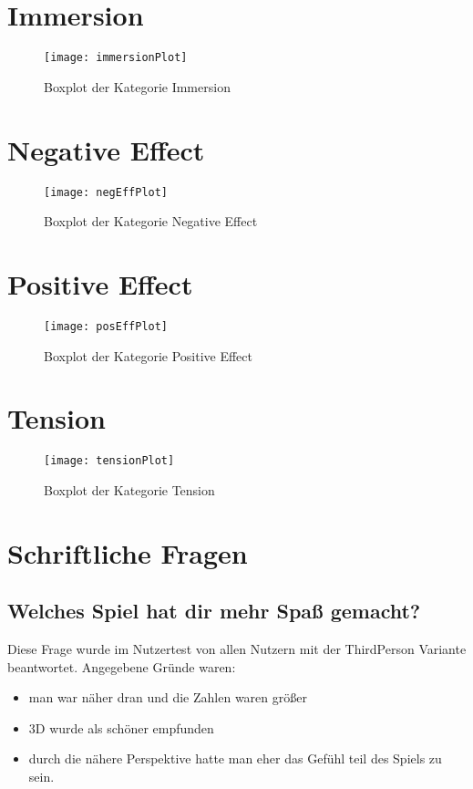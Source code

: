\section{Immersion}
\begin{figure}[h!tb]
	\centering
	\texttt{[image: immersionPlot]}
	\caption{Boxplot der Kategorie Immersion\label{fig:immersionbox}}
\end{figure}

\section{Negative Effect}
\begin{figure}[h!tb]
	\centering
	\texttt{[image: negEffPlot]}
	\caption{Boxplot der Kategorie Negative Effect\label{fig:negeffbox}}
\end{figure}

\section{Positive Effect}
\begin{figure}[htb]
	\centering
	\texttt{[image: posEffPlot]}
	\caption{Boxplot der Kategorie Positive Effect\label{fig:poseffbox}}
\end{figure}

\section{Tension}
\begin{figure}[htb]
	\centering
	\texttt{[image: tensionPlot]}
	\caption{Boxplot der Kategorie Tension\label{fig:tensionbox}}
\end{figure}

\section{Schriftliche Fragen}
\subsection{Welches Spiel hat dir mehr Spaß gemacht?}
Diese Frage wurde im Nutzertest von allen Nutzern mit der ThirdPerson Variante beantwortet. Angegebene Gründe waren:
\begin{itemize}
\item man war näher dran und die Zahlen waren größer
\item 3D wurde als schöner empfunden
\item durch die nähere Perspektive hatte man eher das Gefühl teil des Spiels zu sein.
\end{itemize}
